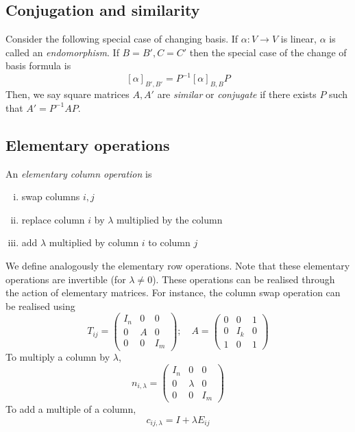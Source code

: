 \subsection{Conjugation and similarity}
Consider the following special case of changing basis.
If \( \alpha \colon V \to V \) is linear, \( \alpha \) is called an \textit{endomorphism}.
If \( B = B', C = C' \) then the special case of the change of basis formula is
\[
	[\alpha]_{B',B'} = P^{-1} [\alpha]_{B,B} P
\]
Then, we say square matrices \( A, A' \) are \textit{similar} or \textit{conjugate} if there exists \( P \) such that \( A' = P^{-1} A P \).

\subsection{Elementary operations}
\begin{definition}
	An \textit{elementary column operation} is
	\begin{enumerate}[(i)]
		\item swap columns \( i, j \)
		\item replace column \( i \) by \( \lambda \) multiplied by the column
		\item add \( \lambda \) multiplied by column \( i \) to column \( j \)
	\end{enumerate}
\end{definition}
We define analogously the elementary row operations.
Note that these elementary operations are invertible (for \( \lambda \neq 0 \)).
These operations can be realised through the action of elementary matrices.
For instance, the column swap operation can be realised using
\[
	T_{ij} = \begin{pmatrix}
		I_n & 0 & 0   \\
		0   & A & 0   \\
		0   & 0 & I_m
	\end{pmatrix};\quad A = \begin{pmatrix}
		0 & 0   & 1 \\
		0 & I_k & 0 \\
		1 & 0   & 1
	\end{pmatrix}
\]
To multiply a column by \( \lambda \),
\[
	n_{i,\lambda} = \begin{pmatrix}
		I_n & 0       & 0   \\
		0   & \lambda & 0   \\
		0   & 0       & I_m
	\end{pmatrix}
\]
To add a multiple of a column,
\[
	c_{ij,\lambda} = I + \lambda E_{ij}
\]
